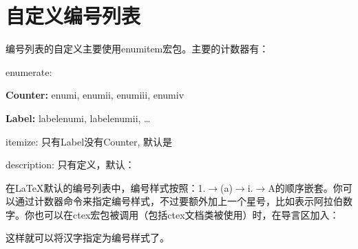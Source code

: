 \section{自定义编号列表}
\label{sec:list}
编号列表的自定义主要使用enumitem宏包。主要的计数器有：
\begin{feai}
\item enumerate:
  \begin{feai}
    \item \textbf{Counter:} enumi, enumii, enumiii, enumiv
    \item \textbf{Label:} labelenumi, labelenumii, \ldots
  \end{feai}
\item itemize: 只有Label没有Counter, 默认是\latexline{\\textbullet}
\item description: 只有\latexline{\\descriptionlabel}定义，默认：
\begin{latex}{}
\newcomand*{}
\end{latex}
\end{feai}

在\LaTeX 默认的编号列表中，编号样式按照：1.$\rightarrow$(a)$\rightarrow$i.$\rightarrow$A的顺序嵌套。你可以通过计数器命令来指定编号样式，不过要额外加上一个星号，比如\latexline{\arabic*}表示阿拉伯数字。你也可以在ctex宏包被调用（包括ctex文档类被使用）时，在导言区加入：
\begin{latex}{}
\AddEnumerateCounter{\chinese}{\chinese}{}
\end{latex}

这样就可以将汉字指定为编号样式了。

